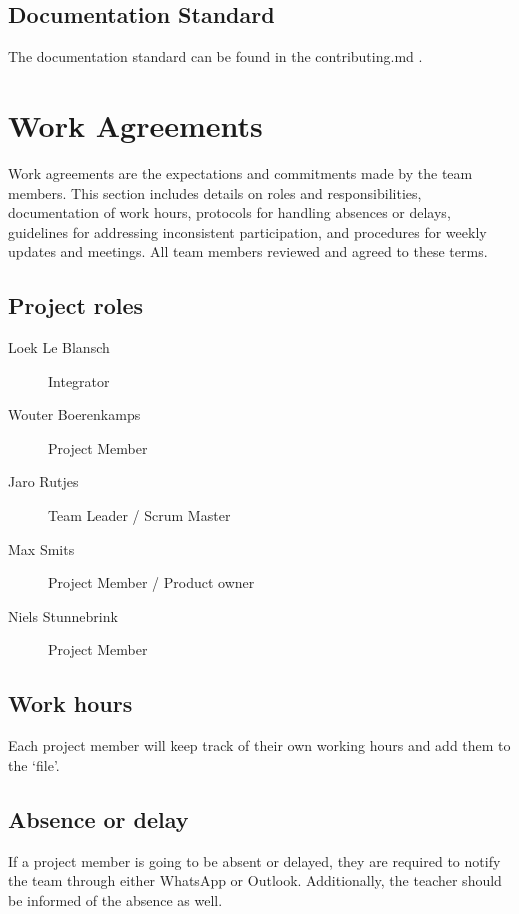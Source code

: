 \documentclass{projdoc}
\begin{document}
\subsection{Documentation Standard}

The documentation standard can be found in the contributing.md
\autocite{crepe:docs-standard}.

\section{Work Agreements}

Work agreements are the expectations and commitments made by the team members. This
section includes details on roles and responsibilities, documentation of work hours,
protocols for handling absences or delays, guidelines for addressing inconsistent
participation, and procedures for weekly updates and meetings. All team members
reviewed and agreed to these terms.

\subsection{Project roles}

\begin{description}
	\item[Loek Le Blansch] Integrator
	\item[Wouter Boerenkamps] Project Member
	\item[Jaro Rutjes] Team Leader / Scrum Master
	\item[Max Smits] Project Member / Product owner
	\item[Niels Stunnebrink] Project Member
\end{description}

\subsection{Work hours}

Each project member will keep track of their own working hours and add them to the
`file'.

\subsection{Absence or delay}

If a project member is going to be absent or delayed, they are required to
notify the team through either WhatsApp or Outlook. Additionally, the teacher
should be informed of the absence as well.
\end{document}

